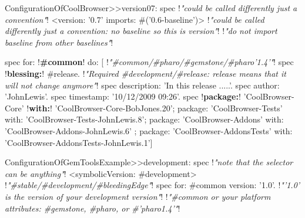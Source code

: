 \documentclass[a4paper,10pt,twoside]{book}
\begin{document}
\begin{footnotesize}
\begin{code}{}
ConfigurationOfCoolBrowser>>version07: spec 					!\emph{"could be called differently just a convention"}!
       <version: '0.7' imports: #('0.6-baseline')>				!\emph{"could be called differently just a convention: no baseline so this is version"}!
															!\emph{"do not import baseline from other baselines"}!
    
       spec for: !\textbf{\#common}! do: [                            !\emph{"\#common/\#pharo/\#gemstone/\#pharo'1.4'"}! 
              spec !\textbf{blessing:}! #release.		!\emph{"Required \#development/\#release: release means that it will not change anymore"}!
              spec description: 'In this release .....'.
              spec author: 'JohnLewis'.
              spec timestamp: '10/12/2009 09:26'.
              spec 
                 !\textbf{package:}! 'CoolBrowser-Core' !\textbf{with:}! 'CoolBrowser-Core-BobJones.20';                     
                 package: 'CoolBrowser-Tests' with: 'CoolBrowser-Tests-JohnLewis.8';
                 package: 'CoolBrowser-Addons' with: 'CoolBrowser-Addons-JohnLewis.6' ;
                 package: 'CoolBrowser-AddonsTests' with: 'CoolBrowser-AddonsTests-JohnLewis.1']
\end{code}
\end{footnotesize} 


\newpage
\begin{footnotesize}
\begin{code}{}
ConfigurationOfGemToolsExample>>development: spec        !\emph{"note that the selector can be anything"}!
       <symbolicVersion: #development>    				!\emph{"\#stable/\#development/\#bleedingEdge"}!
       spec for: #common version: '1.0'.	                   !\emph{"'1.0' is the version of your development version"}!
       !\emph{"\#common or your platform attributes: \#gemstone, \#pharo, or \#'pharo1.4'"}!
\end{code}
\end{footnotesize} 
\end{document}
